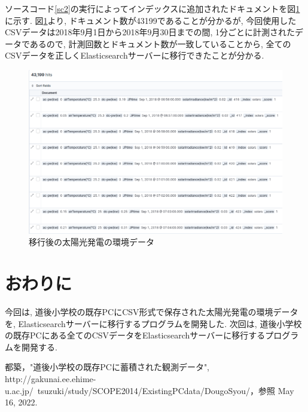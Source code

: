 \documentclass[a4j,12pt,]{jarticle}
\begin{document}
ソースコード\ref{sc2}の実行によってインデックスに追加されたドキュメントを図\ref{p2}に示す.
図\ref{p2}より, ドキュメント数が43199であることが分かるが, 今回使用したCSVデータは2018年9月1日から2018年9月30日までの間, 1分ごとに計測されたデータであるので, 計測回数とドキュメント数が一致していることから, 全てのCSVデータを正しくElasticsearchサーバーに移行できたことが分かる.

\begin{figure}[H]
  \begin{center}
    \includegraphics[width=160mm]{kibana.png}
    \caption{移行後の太陽光発電の環境データ}
    \label{p2}
  \end{center}
\end{figure}

\section{おわりに}
今回は, 道後小学校の既存PCにCSV形式で保存された太陽光発電の環境データを, Elasticsearchサーバーに移行するプログラムを開発した.
次回は, 道後小学校の既存PCにある全てのCSVデータをElasticsearchサーバーに移行するプログラムを開発する.

\begin{thebibliography}{5}
  都築，"道後小学校の既存PCに蓄積された観測データ",\\ http://gakunai.ee.ehime-u.ac.jp/~tsuzuki/study/SCOPE2014/ExistingPCdata/DougoSyou/，参照 May 16, 2022.
\end{thebibliography}
\end{document}

